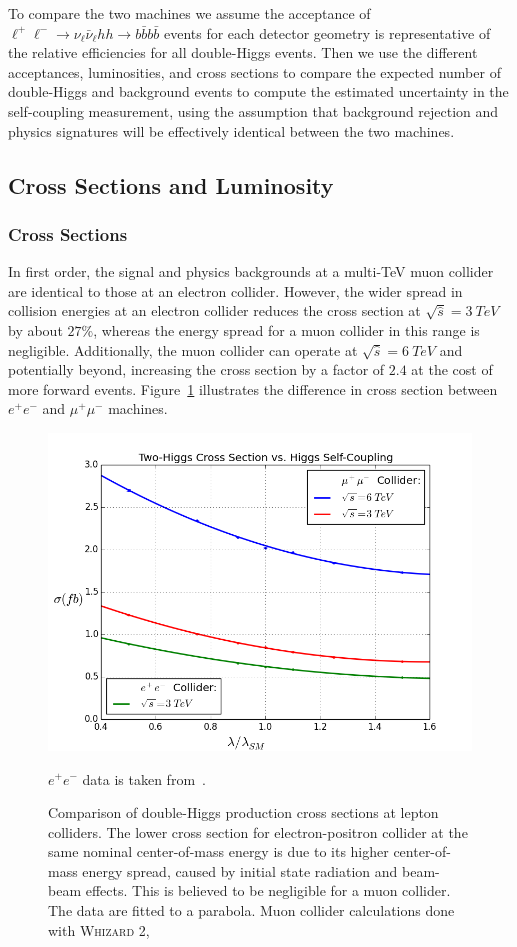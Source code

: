 \documentclass[12pt]{article}
\begin{document}
To compare the two machines we assume the acceptance of $\ell^+\ell^- \rightarrow \nu_\ell \bar{\nu}_\ell hh \rightarrow b\bar{b}b\bar{b}$ events for each detector geometry is representative of the relative efficiencies for all double-Higgs events. Then we use the different acceptances, luminosities, and cross sections to compare the expected number of double-Higgs and background events to compute the estimated uncertainty in the self-coupling measurement, using the assumption that background rejection and physics signatures will be effectively identical between the two machines.

\subsection{Cross Sections and Luminosity}
\subsubsection{Cross Sections}
In first order, the signal and physics backgrounds at a multi-TeV muon collider are identical to those at an electron collider. However, the wider spread in collision energies at an electron collider reduces the cross section at $\sqrt{\hat{s}}=3~TeV$ by about $27\%$, whereas the energy spread for a muon collider in this range is negligible. Additionally, the muon collider can operate at $\sqrt{\hat{s}}=6~TeV$ and potentially beyond, increasing the cross section by a factor of $2.4$ at the cost of more forward events. Figure~\ref{fig:xsects} illustrates the difference in cross section between $e^+e^-$ and $\mu^+\mu^-$ machines. 

\begin{figure}
	\includegraphics[width=\textwidth]{xsects}
	\caption{Comparison of double-Higgs production cross sections at lepton colliders. The lower cross section for electron-positron collider at the same nominal center-of-mass energy is due to its higher center-of-mass energy spread, caused by initial state radiation and beam-beam effects. This is believed to be negligible for a muon collider. The data are fitted to a parabola. Muon collider calculations done with \textsc{Whizard 2},~\cite{whizard,omega}}\label{fig:xsects} $e^+e^-$ data is taken from~\cite{pres:jan}.
\end{figure}
\end{document}
